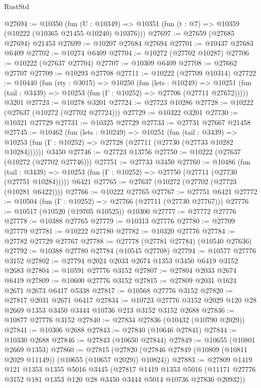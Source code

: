 \begin{lexlean}{RustStd}
\begin{coremodule}
@27694 := @10350
    (fun (U : @10349) => @10351 (fun (t : @7) => @10359 (@10222 (@10365 @21455 @10240) @10376)))
@27697 := @27659 (@27685 @27694) @21453
@27699 := @10207 @27684 @27694
@27701 := @10437 @27683 @6409
@27702 := @10274 @6409
@27704 := @10272 (@27702 @10287)
@27706 := @10222 (@27637 @27704)
@27707 := @10309 @6409
@27708 := @27662 @27707
@27709 := @10293 @27708
@27711 := @10222 (@27709 @10314)
@27722 := @10440
    (fun (rty : @3015) =>
    @10250
      (fun (lets : @10249) =>
      @10251 (fun (tail : @3439) => @10253 (fun (Γ : @10252) => @27706 (@27711 @27672)))))
    @3201
@27723 := @10278 @3201
@27724 := @27723 @10286
@27728 := @10222 (@27637 (@10272 (@27702 @27724)))
@27729 := @10322 @3201
@27730 := @10321 @27729
@27731 := @10325 @27729
@27733 := @27731 @27667 @21458
@27745 := @10462
    (fun (lets : @10249) =>
    @10251
      (fun (tail : @3439) =>
      @10253 (fun (Γ : @10252) => @27728 (@27711 (@27730 (@27733 @10282 @10284))))))
    @3450
@27746 := @27723 @13756
@27750 := @10222 (@27637 (@10272 (@27702 @27746)))
@27751 := @27733 @3450
@27760 := @10486
    (fun (tail : @3439) => @10253 (fun (Γ : @10252) => @27750 (@27711 (@27730 (@27751 @10284)))))
    @6421
@27765 := @27637 (@10272 (@27702 (@27723 (@10281 @6422))))
@27766 := @10222 @27765
@27767 := @27751 @6421
@27772 := @10504 (fun (Γ : @10252) => @27766 (@27711 (@27730 @27767)))
@27776 := @10517 (@10520 (@19705 @10525)) @10300
@27777 := @27772 @27776
@27778 := @10388 @27765
@27779 := @10313 @27776
@27780 := @27709 @27779
@27781 := @10222 @27780
@27782 := @10320 @27776
@27784 := @27782 @27729 @27767
@27788 := @27778 (@27781 @27784) (@10540 @27636)
@27792 := @10388 @27780 @27784 (@10545 @27708)
@27794 := @10577 @27776 @3152
@27802 := @27794 @2024 @2033 @2674 @1353 @3450 @6419 @3152 @2683
@27804 := @10591 @27776 @3152
@27807 := @27804 @2033 @2674 @6419
@27809 := @10600 @27776 @3152
@27815 := @27809 @2031 @1624 @2671 @2673 @6417 @5338
@27817 := @10568 @27776 @3152
@27820 := @27817 @2031 @2671 @6417
@27834 := @10723 @27776 @3152 @2029 @120 @28 @2669 @1353 @3450 @3444 @10736 @213 @3152 @3152 @2688
@27836 := @10877 @27776 @3152
@27840 := @27834 @27836 (@10432 (@10790 @2029))
@27841 := @10306 @2688
@27843 := @27840 (@10646 @27841)
@27844 := @10330 @2688
@27846 := @27843 (@10650 @27844)
@27849 := @10655 (@10801 @2669 @1353)
@27860 := @27815
    (@27820 (@27846 @27849 (@10809 (@10811 @2029 @11149)) (@10655 (@10657 @2029)) @10824))
@27883 := @27809
    @1419
    @121
    @1353
    @1355
    @5016
    @3445
    (@27817
      @1419
      @1353
      @5016
      (@11171 @27776 @3152 @181 @1353 @120 @28 @3450 @3444 @5014 @10736 @27836 @20932))

\end{coremodule}
\end{lexlean}
